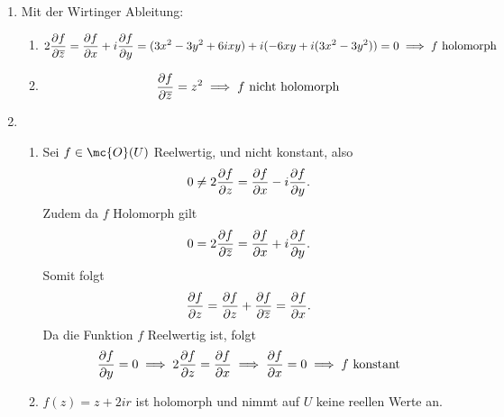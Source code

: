 \documentclass[ngerman]{report}
\begin{document}
    \begin{answer}
        \begin{enumerate}
            \item Mit der Wirtinger Ableitung:
            \begin{enumerate}
                \item             
                \begin{align*}
                    2\pder[f]{\overline{z}} = \pder[f]{x} + i\pder[f]{y} = (3x^2-3y^2+6ixy)+i(-6xy+i(3x^2-3y^2)) = 0 \implies f \text{ holomorph}
                \end{align*}
                \item 
                \begin{align*}
                    \pder[f]{\overline{z}} = z^2 \implies f \text{ nicht holomorph}
                \end{align*}
            \end{enumerate}
            \item 
            \begin{enumerate}
                \item Sei $f \in \mc{O}(U)$ Reelwertig, und nicht konstant, also
                \begin{align*}
                    0\neq 2\pder[f]{z} = \pder[f]{x} - i\pder[f]{y}.
                \end{align*}
                Zudem da $f$ Holomorph gilt
                \begin{align*}
                    0 = 2\pder[f]{\overline{z}} = \pder[f]{x} + i\pder[f]{y}.
                \end{align*}
                Somit folgt
                \begin{align*}
                    \pder[f]{z} = \pder[f]{z}+ \pder[f]{\overline{z}} = \pder[f]{x}.
                \end{align*}
                Da die Funktion $f$ Reelwertig ist, folgt
                \begin{align*}
                    \pder[f]{y} = 0 \implies 2\pder[f]{z} = \pder[f]{x} \implies \pder[f]{x} = 0 \implies f \text{ konstant}
                \end{align*}
                \item $f(z) = z+2ir$ ist holomorph und nimmt auf $U$ keine reellen Werte an.
            \end{enumerate}
        \end{enumerate}
    \end{answer}\newpage
\end{document}
